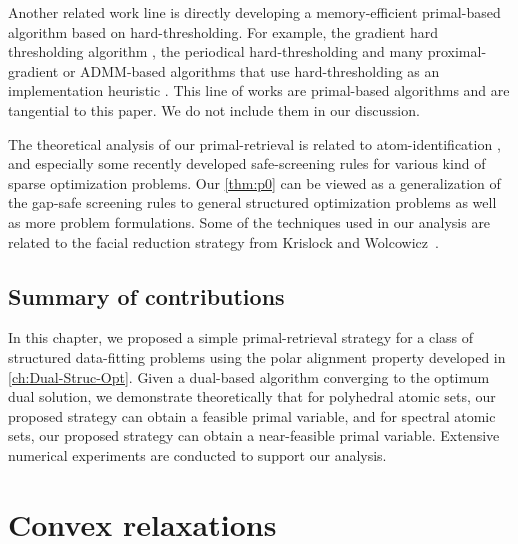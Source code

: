 Another related work line is directly developing a memory-efficient primal-based algorithm based on hard-thresholding. For example, the gradient hard thresholding algorithm \cite{YuanLZ17}, the periodical hard-thresholding \cite{Allen-ZhuHHL17} and many proximal-gradient or ADMM-based algorithms that use hard-thresholding as an implementation heuristic \cite{mazumder2010spectral,Lin11,hsieh2014nuclear}. This line of works are primal-based algorithms and are tangential to this paper. We do not include them in our discussion. 

The theoretical analysis of our primal-retrieval is related to atom-identification \cite{BurM88,hare2004identifying,hare2011identifying}, and especially some recently developed safe-screening rules \cite{Ghaoui12,wang2013lasso,liu2014safe,WangZLWY14,Raj2015ScreeningRF,BonnefoyERG15,XiangWR17,NdiayeFGS17,ZhangHLYCHW17,kuang2017screening,Atamtrk2020SafeSR,Bao20} for various kind of sparse optimization problems. Our \autoref{thm:p0} can be viewed as a generalization of the gap-safe screening rules to general structured optimization problems as well as more problem formulations. Some of the techniques used in our analysis are related to the facial reduction strategy from Krislock and Wolcowicz~\cite{krislock2010explicit}. 

\subsection{Summary of contributions}

In this chapter, we proposed a simple primal-retrieval strategy for a class of structured data-fitting problems using the polar alignment property developed in \autoref{ch:Dual-Struc-Opt}. Given a dual-based algorithm converging to the optimum dual solution, we demonstrate theoretically that for polyhedral atomic sets, our proposed strategy can obtain a feasible primal variable, and for spectral atomic sets, our proposed strategy can obtain a near-feasible primal variable. Extensive numerical experiments are conducted to support our analysis. 


\section{Convex relaxations}
\label{sec:4-2}

